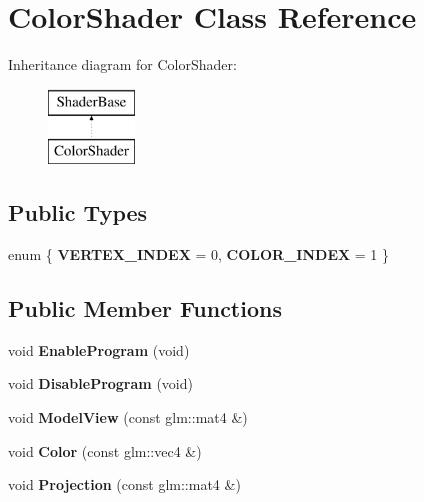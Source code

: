 \hypertarget{classColorShader}{\section{\-Color\-Shader \-Class \-Reference}
\label{classColorShader}
}
\-Inheritance diagram for \-Color\-Shader\-:\begin{figure}[H]
\begin{center}
\leavevmode
\includegraphics[height=2.000000cm]{classColorShader}
\end{center}
\end{figure}
\subsection*{\-Public \-Types}
\begin{DoxyCompactItemize}
\item 
enum \{ {\bfseries \-V\-E\-R\-T\-E\-X\-\_\-\-I\-N\-D\-E\-X} =  0, 
{\bfseries \-C\-O\-L\-O\-R\-\_\-\-I\-N\-D\-E\-X} =  1
 \}
\end{DoxyCompactItemize}
\subsection*{\-Public \-Member \-Functions}
\begin{DoxyCompactItemize}
\item 
\hypertarget{classColorShader_a4596a361346a800e9f62fe79f0dd6f6e}{void {\bfseries \-Enable\-Program} (void)}\label{classColorShader_a4596a361346a800e9f62fe79f0dd6f6e}

\item 
\hypertarget{classColorShader_a1643a96f4c036e02311080aef95573be}{void {\bfseries \-Disable\-Program} (void)}\label{classColorShader_a1643a96f4c036e02311080aef95573be}

\item 
\hypertarget{classColorShader_af6d90987d172f4501d1f0bd07cdb11a1}{void {\bfseries \-Model\-View} (const glm\-::mat4 \&)}\label{classColorShader_af6d90987d172f4501d1f0bd07cdb11a1}

\item 
\hypertarget{classColorShader_a58dd5bed84ed183352bdd722764d8111}{void {\bfseries \-Color} (const glm\-::vec4 \&)}\label{classColorShader_a58dd5bed84ed183352bdd722764d8111}

\item 
\hypertarget{classColorShader_a8e05747a087576897e925b780d602dc0}{void {\bfseries \-Projection} (const glm\-::mat4 \&)}\label{classColorShader_a8e05747a087576897e925b780d602dc0}

\end{DoxyCompactItemize}
